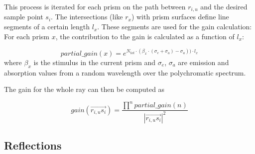 This process is iterated for each prism on the path between $r_{i,u}$ and the
desired sample point $s_i$. The intersections (like $r_x$) with prism surfaces
define line segments of a certain length $l_x$. These segments are used for the
gain calculation: For each prism $x$, the contribution to the gain is calculated
as a function of $l_x$:

\begin{equation}
\label{eq:partial_gain}
  partial\_gain(x) = 
  e^{N_{tot} \cdot (\beta_x \cdot (\sigma_e + \sigma_a) - \sigma_a)) \cdot l_x}
\end{equation}
where $\beta_x$ is the stimulus in the current
prism and $\sigma_e$, $\sigma_a$ are emission and absorption
values from a random wavelength over the polychromatic spectrum.

The gain for the whole ray can then be computed as

\begin{equation}
\label{eq:gain}
  gain(\overrightarrow{r_{i,u}s_i}) =  
  \frac{\prod^npartial\_gain(n)}{ |\overrightarrow{r_{i,u}s_i}|^2}  
\end{equation}



\subsection{Reflections}
\label{subsec:reflections}


